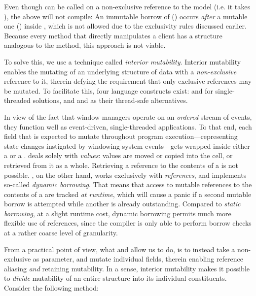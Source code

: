 Even though  can be called on a non-exclusive
reference to the model (i.e. it takes ), the
above will not compile: An immutable borrow of 
() occurs \textit{after}
a mutable one () inside
, which is not allowed due to the exclusivity rules
discussed earlier. Because every method that directly manipulates a client has a
structure analogous to the  method, this approach is
not viable.

To solve this, we use a technique called \textit{interior mutability}. Interior
mutability enables the mutating of an underlying structure of data with a
\textit{non-exclusive} reference to it, therein defying the requirement that
only exclusive references may be mutated\cite{therustbook}. To facilitate
this, four language constructs exist:  and  for
single-threaded solutions, and  and  as their
thread-safe alternatives\cite{therustbook, therustreference}.

In view of the fact that window managers operate on an \textit{ordered}
stream of events, they function well as event-driven, single-threaded
applications. To that end, each  field that is expected to
mutate throughout program execution---representing state changes instigated
by windowing system events---gets wrapped inside either a  or a
.  deals solely with \textit{values}: values are moved
or copied into the cell, or retrieved from it as a whole\cite{therustbook,
intmutpatterns}. Retrieving a reference to the contents of a  is
not possible\cite{therustbook, intmutpatterns}. , on the other
hand, works exclusively with \textit{references}, and implements so-called
\textit{dynamic borrowing}\cite{therustbook, intmutpatterns}. That means
that access to mutable references to the contents of a  are
tracked \textit{at runtime}, which will cause a panic if a second mutable
borrow is attempted while another is already outstanding\cite{therustbook,
intmutpatterns}. Compared to \textit{static borrowing}, at a slight runtime
cost, dynamic borrowing permits much more flexible use of references, since
the compiler is only able to perform borrow checks at a rather coarse level of
granularity\cite{therustbook, intmutpatterns}.

From a practical point of view, what  and  allow us to
do, is to instead take a non-exclusive  as parameter, and mutate
individual fields, therein enabling reference aliasing \textit{and} retaining
mutability. In a sense, interior mutability makes it possible to \textit{divide}
mutability of an entire structure into its individual constituents. Consider the
following  method:


